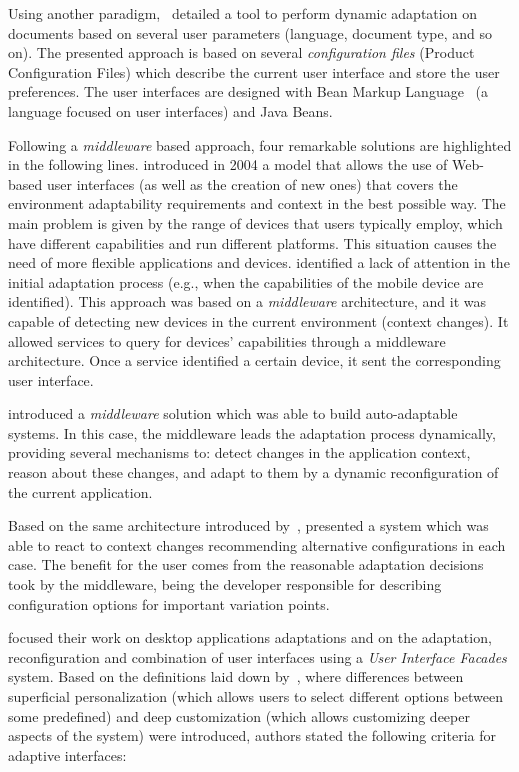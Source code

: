 Using another paradigm,~\citet{lehtonen_dynamic_2002} detailed a tool to perform
dynamic adaptation on documents based on several user parameters (language,
document type, and so on). The presented approach is based on several \textit{configuration
files} (Product Configuration Files) which describe the current user interface and
store the user preferences. The user interfaces are designed with Bean Markup
Language~\citep{weerawarana_bean_2001} (a language focused on user interfaces)
and Java Beans.

Following a \textit{middleware} based approach, four remarkable solutions are
highlighted in the following lines. \citet{repo_facilitating_2004} introduced in 
2004 a model that allows the use of Web-based user interfaces (as well as the 
creation of new ones) that covers the environment adaptability requirements and 
context in the best possible way. The main problem is given by the range of 
devices that users typically employ, which have different capabilities and run 
different platforms. This situation causes the need of more flexible applications 
and devices. \citeauthor{repo_facilitating_2004} identified a lack of attention in the initial adaptation process 
(e.g., when the capabilities of the mobile device are identified). This approach 
was based on a \textit{middleware} architecture, and it was capable of detecting 
new devices in the current environment (context changes). It allowed services to 
query for devices' capabilities through a middleware architecture. Once a service 
identified a certain device, it sent the corresponding user interface. 

\citet{nilsson_model_based_2006} introduced a \textit{middleware} solution
which was able to build auto-adaptable systems. In this case, the middleware 
leads the adaptation process dynamically, providing several mechanisms to: 
detect changes in the application context, reason about these changes, and adapt 
to them by a dynamic reconfiguration of the current application. 

Based on the same architecture introduced by~\citet{nilsson_model_based_2006},
\citet{hallsteinsen_self_adaptation_2004} presented a system which was able to 
react to context changes recommending alternative configurations in each case.
The benefit for the user comes from the reasonable adaptation decisions took 
by the middleware, being the developer responsible for describing configuration 
options for important variation points.

\citet{stuerzlinger_user_2006} focused their work on desktop applications
adaptations and on the adaptation, reconfiguration and combination of user
interfaces using a \textit{User Interface Facades} system. Based on the definitions
laid down by~\citet{marmolin_medium_1995}, where differences between superficial
personalization (which allows users to select different options between some
predefined) and deep customization (which allows customizing deeper aspects of
the system) were introduced, authors stated the following criteria for adaptive
interfaces:

